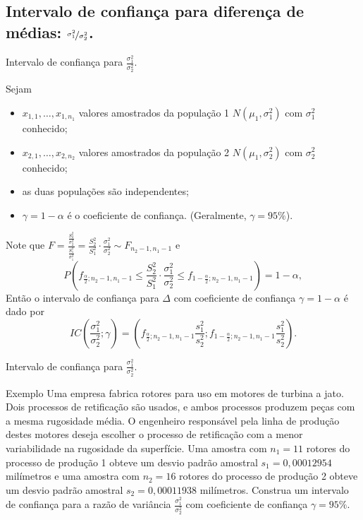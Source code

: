 \documentclass[9pt]{beamer}
\begin{document}
\subsection{Intervalo de confiança para diferença de médias: $\nicefrac{\sigma_1^2}{\sigma_2^2}$.}

\begin{frame}{Intervalo de confiança para $\frac{\sigma_1^2}{\sigma_2^2}$.}

\small

Sejam
\begin{itemize}
	\item $x_{1,1}, \dots, x_{1,n_1}$ valores amostrados da população 1 $N(\mu_1, \sigma_1^2)$ com $\sigma_1^2$ conhecido;
	\item $x_{2,1}, \dots, x_{2,n_2}$ valores amostrados da população 2 $N(\mu_1, \sigma_2^2)$ com $\sigma_2^2$ conhecido;
	\item as duas populações são independentes;
	\item $\gamma=1-\alpha$ é o coeficiente de confiança. (Geralmente, $\gamma=95\%$).
\end{itemize}

Note que $F = \frac{\frac{S_2^2}{\sigma_2^2}}{\frac{S_1^2}{\sigma_1^2}} = \frac{S_2^2}{S_1^2} \cdot  \frac{\sigma_1^2}{\sigma_2^2} \sim F_{n_2-1, n_1-1}$ e 
$$P\left( f_{\frac{\alpha}{2}; n_2-1, n_1-1} \leq \frac{S_2^2}{S_1^2} \cdot  \frac{\sigma_1^2}{\sigma_2^2} \leq f_{1-\frac{\alpha}{2}; n_2-1, n_1-1} \right) = 1 - \alpha,$$
Então o intervalo de confiança para $\Delta$ com coeficiente de confiança $\gamma=1-\alpha$ é dado por
$$IC\left(\frac{\sigma_1^2}{\sigma_2^2}; \gamma\right) = \left( f_{\frac{\alpha}{2}; n_2-1, n_1-1} \frac{s_1^2}{s_2^2}; f_{1-\frac{\alpha}{2}; n_2-1, n_1-1} \frac{s_1^2}{s_2^2} \right).$$

\normalsize
\end{frame}

\begin{frame}{Intervalo de confiança para $\frac{\sigma_1^2}{\sigma_2^2}$.}
\begin{block}{Exemplo}
	Uma empresa fabrica rotores para uso em motores de turbina a jato. Dois processos de retificação são usados, e ambos processos produzem peças com a mesma rugosidade média.  O engenheiro responsável pela linha de produção destes motores deseja escolher o processo de retificação com a menor variabilidade na rugosidade da superfície. Uma amostra com $n_1 = 11$ rotores do processo de produção 1 obteve um desvio padrão amostral $s_1=0,00012954$ milímetros e uma amostra com $n_2=16$ rotores do processo de produção 2 obteve um desvio padrão amostral $s_2=0,00011938$ milímetros. Construa um intervalo de confiança para a razão de variância $\frac{\sigma_1^2}{\sigma_2^2}$ com coeficiente de confiança $\gamma = 95\%$.
\end{block}
\end{frame}
\end{document}
